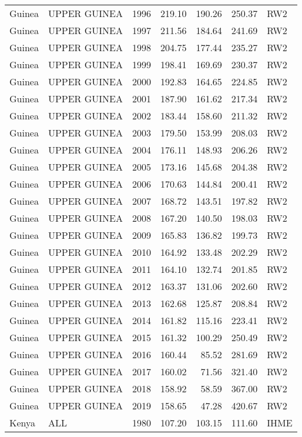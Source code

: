 \begin{longtable}{lllrrrl}
  Guinea & UPPER GUINEA & 1996 & 219.10 & 190.26 & 250.37 & RW2 \\ 
  Guinea & UPPER GUINEA & 1997 & 211.56 & 184.64 & 241.69 & RW2 \\ 
  Guinea & UPPER GUINEA & 1998 & 204.75 & 177.44 & 235.27 & RW2 \\ 
  Guinea & UPPER GUINEA & 1999 & 198.41 & 169.69 & 230.37 & RW2 \\ 
  Guinea & UPPER GUINEA & 2000 & 192.83 & 164.65 & 224.85 & RW2 \\ 
  Guinea & UPPER GUINEA & 2001 & 187.90 & 161.62 & 217.34 & RW2 \\ 
  Guinea & UPPER GUINEA & 2002 & 183.44 & 158.60 & 211.32 & RW2 \\ 
  Guinea & UPPER GUINEA & 2003 & 179.50 & 153.99 & 208.03 & RW2 \\ 
  Guinea & UPPER GUINEA & 2004 & 176.11 & 148.93 & 206.26 & RW2 \\ 
  Guinea & UPPER GUINEA & 2005 & 173.16 & 145.68 & 204.38 & RW2 \\ 
  Guinea & UPPER GUINEA & 2006 & 170.63 & 144.84 & 200.41 & RW2 \\ 
  Guinea & UPPER GUINEA & 2007 & 168.72 & 143.51 & 197.82 & RW2 \\ 
  Guinea & UPPER GUINEA & 2008 & 167.20 & 140.50 & 198.03 & RW2 \\ 
  Guinea & UPPER GUINEA & 2009 & 165.83 & 136.82 & 199.73 & RW2 \\ 
  Guinea & UPPER GUINEA & 2010 & 164.92 & 133.48 & 202.29 & RW2 \\ 
  Guinea & UPPER GUINEA & 2011 & 164.10 & 132.74 & 201.85 & RW2 \\ 
  Guinea & UPPER GUINEA & 2012 & 163.37 & 131.06 & 202.60 & RW2 \\ 
  Guinea & UPPER GUINEA & 2013 & 162.68 & 125.87 & 208.84 & RW2 \\ 
  Guinea & UPPER GUINEA & 2014 & 161.82 & 115.16 & 223.41 & RW2 \\ 
  Guinea & UPPER GUINEA & 2015 & 161.32 & 100.29 & 250.49 & RW2 \\ 
  Guinea & UPPER GUINEA & 2016 & 160.44 & 85.52 & 281.69 & RW2 \\ 
  Guinea & UPPER GUINEA & 2017 & 160.02 & 71.56 & 321.40 & RW2 \\ 
  Guinea & UPPER GUINEA & 2018 & 158.92 & 58.59 & 367.00 & RW2 \\ 
  Guinea & UPPER GUINEA & 2019 & 158.65 & 47.28 & 420.67 & RW2 \\ 
  Kenya & ALL & 1980 & 107.20 & 103.15 & 111.60 & IHME \\ 

\end{longtable}
